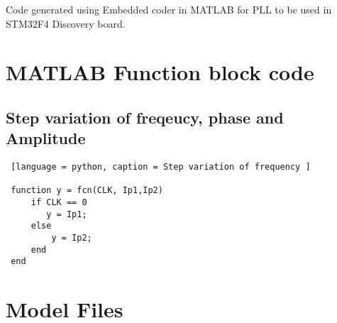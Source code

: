 
Code generated using Embedded coder in MATLAB for PLL to be used in STM32F4 Discovery board.

\section{MATLAB Function block code}
\subsection{Step variation of freqeucy, phase and Amplitude}

\begin{lstlisting} [language = python, caption = Step variation of frequency ]

 function y = fcn(CLK, Ip1,Ip2)
     if CLK == 0
        y = Ip1;
     else
         y = Ip2;
     end
 end

\end{lstlisting}

\section{Model Files}

